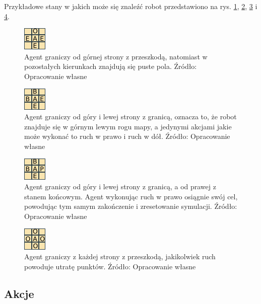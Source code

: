 Przykładowe stany w jakich może się znaleźć robot przedstawiono na rys. \ref{fig:grid1}, \ref{fig:grid2}, 
\ref{fig:grid3} i \ref{fig:grid4}.

\begin{figure}[h!]
    \centering
    \includegraphics[scale=10]{grid1}
    \caption{Agent graniczy od górnej strony z przeszkodą, natomiast w pozostałych kierunkach znajdują się puste pola. 
Źródło: Opracowanie własne}
    \label{fig:grid1}
\end{figure}

\begin{figure}[h!]
    \centering
    \includegraphics[scale=10]{grid2}
    \caption{Agent graniczy od góry i lewej strony z granicą, oznacza to, że robot znajduje się w górnym lewym rogu 
mapy, a jedynymi akcjami jakie może wykonać to ruch w prawo i ruch w dół. Źródło: Opracowanie własne}
    \label{fig:grid2}
\end{figure}

\begin{figure}[h!]
    \centering
    \includegraphics[scale=10]{grid3}
    \caption{Agent graniczy od góry i lewej strony z granicą, a od prawej z stanem końcowym. Agent wykonując 
ruch w prawo osiągnie swój cel, powodując tym samym zakończenie i zresetowanie symulacji. Źródło: Opracowanie własne}
    \label{fig:grid3}
\end{figure}

\begin{figure}[h!]
    \centering
    \includegraphics[scale=10]{grid4}
    \caption{Agent graniczy z każdej strony z przeszkodą, jakikolwiek ruch powoduje utratę punktów. Źródło: 
Opracowanie własne}
    \label{fig:grid4}
\end{figure}

\subsection{Akcje}
\label{subsec:akcje}

